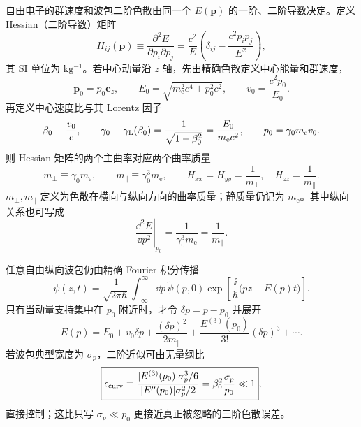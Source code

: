 自由电子的群速度和波包二阶色散由同一个 $E(\mathbf p)$ 的一阶、二阶导数决定。定义 Hessian（二阶导数）矩阵
\begin{equation}
 \boxed{
 H_{ij}(\mathbf p)
 \equiv\frac{\partial^2E}{\partial p_i\partial p_j}
 =\frac{c^2}{E}
 \left(\delta_{ij}-\frac{c^2p_ip_j}{E^2}\right),}
 \label{eq:exact_dispersion_hessian}
\end{equation}
其 SI 单位为 $\mathrm{kg^{-1}}$。若中心动量沿 $z$ 轴，先由精确色散定义中心能量和群速度，
\begin{equation*}
 \mathbf p_0=p_0\mathbf e_z,
 \qquad
 E_0=\sqrt{m_{\mathrm e}^2c^4+p_0^2c^2},
 \qquad
 v_0=\frac{c^2p_0}{E_0}.
\end{equation*}
再定义中心速度比与其 Lorentz 因子
\begin{equation*}
 \beta_0\equiv\frac{v_0}{c},
 \qquad
 \gamma_0\equiv\gamma_{\rm L}(\beta_0)
 =\frac1{\sqrt{1-\beta_0^2}}
 =\frac{E_0}{m_{\mathrm e} c^2},
 \qquad
 p_0=\gamma_0m_{\mathrm e} v_0.
\end{equation*}
则 Hessian 矩阵的两个主曲率对应两个曲率质量
\begin{equation}
 \boxed{
 m_\perp\equiv\gamma_0m_{\mathrm e},
 \qquad
 m_\parallel\equiv\gamma_0^3m_{\mathrm e},}
 \qquad
 H_{xx}=H_{yy}=\frac1{m_\perp},
 \quad
 H_{zz}=\frac1{m_\parallel}.
 \label{eq:dispersion-hessian-principal-r15}
\end{equation}
$m_\perp,m_\parallel$ 定义为色散在横向与纵向方向的曲率质量；静质量仍记为 $m_{\mathrm e}$。其中纵向关系也可写成
\begin{equation}
 \left.\frac{\dd^2 E}{\dd p^2}\right|_{p_0}
 =\frac1{\gamma_0^3m_{\mathrm e}}
 =\frac1{m_\parallel}.
 \label{eq:longitudinal-mass}
\end{equation}

任意自由纵向波包仍由精确 Fourier 积分传播
\begin{equation}
 \psi(z,t)=\frac{1}{\sqrt{2\pi\hbar}}
 \int_{-\infty}^{\infty}\dd p\,
 \widetilde\psi(p,0)
 \exp\!\left[\frac{\ii}{\hbar}\bigl(pz-E(p)t\bigr)\right].
 \label{eq:exact-wavepacket}
\end{equation}
只有当动量支持集中在 $p_0$ 附近时，才令 $\delta p=p-p_0$ 并展开
\begin{equation}
 E(p)=E_0+v_0\delta p+\frac{(\delta p)^2}{2m_\parallel}
 +\frac{E^{(3)}(p_0)}{3!}(\delta p)^3+\cdots.
 \label{eq:dispersion-taylor}
\end{equation}
若波包典型宽度为 $\sigma_p$，二阶近似可由无量纲比
\begin{equation}
 \boxed{
 \epsilon_{\rm curv}\equiv
 \frac{|E^{(3)}(p_0)|\sigma_p^3/6}
 {|E''(p_0)|\sigma_p^2/2}
 =\beta_0^2\frac{\sigma_p}{p_0}\ll1},
 \label{eq:third-order-control}
\end{equation}
直接控制；这比只写 $\sigma_p\ll p_0$ 更接近真正被忽略的三阶色散误差。

